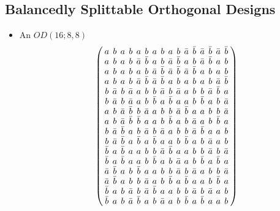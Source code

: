 \documentclass{beamer}
\begin{document}
\subsection{Balancedly Splittable Orthogonal Designs}

\begin{frame}

  \begin{itemize}
  \item An $OD(16;8,8)$
    \[
    \arraycolsep=2.0pt\def\arraystretch{0.75}
    \left(
      \begin{array}{cccccccccccccccc}
        a&b&a&b&a&b&a&b&a&b&\bar{a}&\bar{b}&\bar{a}&\bar{b}&\bar{a}&\bar{b}\\
        a&b&a&b&\bar{a}&\bar{b}&a&b&\bar{a}&\bar{b}&a&b&\bar{a}&\bar{b}&a&b\\
        a&b&a&b&a&b&\bar{a}&\bar{b}&\bar{a}&\bar{b}&\bar{a}&\bar{b}&a&b&a&b\\
        a&b&a&b&\bar{a}&\bar{b}&\bar{a}&\bar{b}&a&b&a&b&a&b&\bar{a}&\bar{b}\\
        b&\bar{a}&b&\bar{a}&a&b&b&\bar{a}&b&\bar{a}&a&b&b&\bar{a}&\bar{b}&a\\
        b&\bar{a}&b&\bar{a}&a&b&\bar{b}&a&\bar{b}&a&a&b&\bar{b}&a&b&\bar{a}\\
        a&b&\bar{a}&\bar{b}&b&\bar{a}&a&b&b&\bar{a}&\bar{b}&a&a&b&b&\bar{a}\\
        a&b&\bar{a}&\bar{b}&\bar{b}&a&a&b&\bar{b}&a&b&\bar{a}&a&b&\bar{b}&a\\
        b&\bar{a}&\bar{b}&a&b&\bar{a}&b&\bar{a}&a&b&b&\bar{a}&\bar{b}&a&a&b\\
        b&\bar{a}&\bar{b}&a&\bar{b}&a&\bar{b}&a&a&b&\bar{b}&a&b&\bar{a}&a&b\\
        \bar{b}&a&\bar{b}&a&a&b&b&\bar{a}&\bar{b}&a&a&b&b&\bar{a}&b&\bar{a}\\
        \bar{b}&a&\bar{b}&a&a&b&\bar{b}&a&b&\bar{a}&a&b&\bar{b}&a&\bar{b}&a\\
        \bar{a}&\bar{b}&a&b&\bar{b}&a&a&b&b&\bar{a}&b&\bar{a}&a&b&b&\bar{a}\\
        \bar{a}&\bar{b}&a&b&b&\bar{a}&a&b&\bar{b}&a&\bar{b}&a&a&b&\bar{b}&a\\
        \bar{b}&a&b&\bar{a}&b&\bar{a}&\bar{b}&a&a&b&b&\bar{a}&b&\bar{a}&a&b\\
        \bar{b}&a&b&\bar{a}&\bar{b}&a&b&\bar{a}&a&b&\bar{b}&a&\bar{b}&a&a&b\\
      \end{array}
    \right)
    \]
  \end{itemize}

\end{frame}
\end{document}
